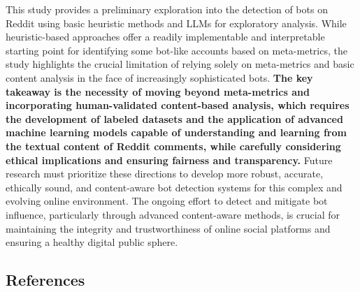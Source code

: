 \documentclass[
  12pt,
  letterpaper,
  DIV=11,
  numbers=noendperiod]{scrartcl}
\begin{document}
This study provides a preliminary exploration into the detection of bots
on Reddit using basic heuristic methods and LLMs for exploratory
analysis. While heuristic-based approaches offer a readily implementable
and interpretable starting point for identifying some bot-like accounts
based on meta-metrics, the study highlights the crucial limitation of
relying solely on meta-metrics and basic content analysis in the face of
increasingly sophisticated bots. \textbf{The key takeaway is the
necessity of moving beyond meta-metrics and incorporating
human-validated content-based analysis, which requires the development
of labeled datasets and the application of advanced machine learning
models capable of understanding and learning from the textual content of
Reddit comments, while carefully considering ethical implications and
ensuring fairness and transparency.} Future research must prioritize
these directions to develop more robust, accurate, ethically sound, and
content-aware bot detection systems for this complex and evolving online
environment. The ongoing effort to detect and mitigate bot influence,
particularly through advanced content-aware methods, is crucial for
maintaining the integrity and trustworthiness of online social platforms
and ensuring a healthy digital public sphere.

\subsection{References}\label{references}
\end{document}
